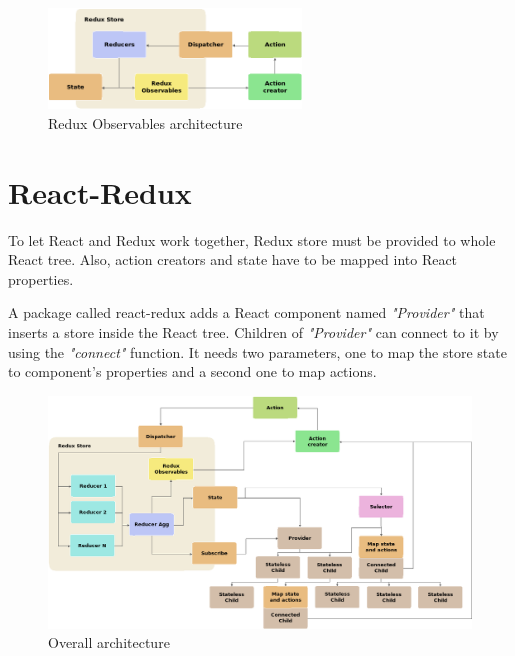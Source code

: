 \begin{figure}[htb]
	\begin{center}
		\includegraphics[width=0.6\textwidth]{./figures/redux-observables.png}
		\caption{Redux Observables architecture}
		\label{F:redux-observables-architecture}
	\end{center}
\end{figure}

\section{React-Redux}

To let React and Redux work together, Redux store must be provided to whole
React tree. Also, action creators and state have to be mapped into React
properties.

A package called react-redux adds a React component named \textit{"Provider"}
that inserts a store inside the React tree. Children of \textit{"Provider"} can
connect to it by using the \textit{"connect"} function. It needs two 
parameters, one to map the store state to component's properties and a second 
one to map actions.

\begin{landscape}
\begin{figure}[htp]
	\begin{center}
		\includegraphics[width=1.3\textwidth]
		{./figures/overall-architecture.png}

		\caption{Overall architecture}
		\label{F:overall-architecture}
	\end{center}
\end{figure}
\end{landscape}





